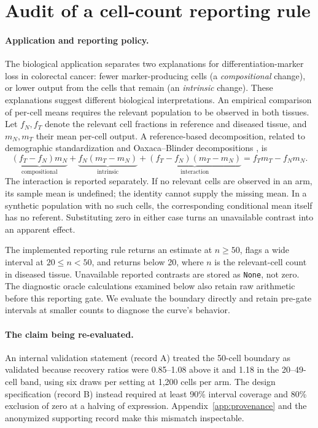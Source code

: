 \section{Audit of a cell-count reporting rule}
\label{sec:calibration}

\paragraph{Application and reporting policy.}
The biological application separates two explanations for differentiation-marker
loss in colorectal cancer: fewer marker-producing cells (a \emph{compositional}
change), or lower output from the cells that remain (an \emph{intrinsic}
change). These explanations suggest different biological interpretations.
An empirical comparison of per-cell means requires the relevant population
to be observed in both tissues. Let $f_N,f_T$ denote the relevant cell fractions
in reference and diseased tissue, and $m_N,m_T$ their mean per-cell output.
A reference-based decomposition, related to demographic standardization and Oaxaca--Blinder decompositions
\citep{kitagawa1955,oaxaca1973,blinder1973}, is
\begin{equation}
\underbrace{(f_T-f_N)m_N}_{\text{compositional}} +
\underbrace{f_N(m_T-m_N)}_{\text{intrinsic}} +
\underbrace{(f_T-f_N)(m_T-m_N)}_{\text{interaction}}
= f_Tm_T-f_Nm_N.
\label{eq:kitagawa}
\end{equation}
The interaction is reported separately. If no relevant cells are observed in
an arm, its sample mean is undefined; the identity cannot supply the missing
mean. In a synthetic population with no such cells, the corresponding
conditional mean itself has no referent. Substituting zero in either case
turns an unavailable contrast into an apparent effect.

The implemented reporting rule returns an estimate at $n\geq50$, flags a wide
interval at $20\leq n<50$, and returns \notest{} below 20, where $n$ is the
relevant-cell count in diseased tissue. Unavailable reported contrasts are
stored as \texttt{None}, not zero. The diagnostic oracle calculations examined
below also retain raw arithmetic before this reporting gate. We evaluate the boundary directly and retain pre-gate intervals at smaller
counts to diagnose the curve's behavior.

\paragraph{The claim being re-evaluated.}
An internal validation statement (record A) treated the 50-cell boundary as validated
because recovery ratios were 0.85--1.08 above it and 1.18 in the 20--49-cell
band, using six draws per setting at 1{,}200 cells per arm. The design specification
(record B) instead required at least 90\% interval coverage and 80\% exclusion
of zero at a halving of expression. Appendix~\ref{app:provenance} and the
anonymized supporting record make this mismatch inspectable.

